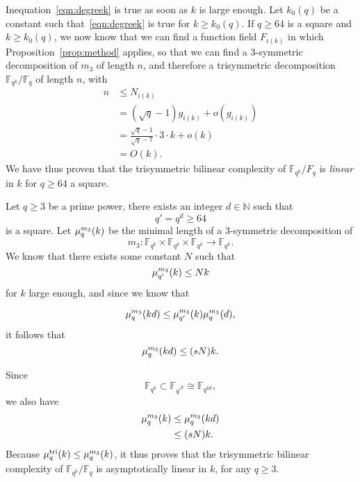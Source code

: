 \documentclass[11pt]{article}
\begin{document}
Inequation~\eqref{eqn:degreek} is true as soon as $k$ is large enough. Let
$k_0(q)$ be a constant such that~\eqref{eqn:degreek} is true for $k\geq k_0(q)$.
If $q\geq 64$ is a square and $k\geq k_0(q)$, we now know that we can find a
function field $F_{i(k)}$ in which Proposition~\ref{prop:method}
applies, so that we can find a $3$-symmetric decomposition of $m_3$ of length
$n$, and therefore a trisymmetric decomposition $\mathbb{F}_{q^k}/\mathbb{F}_q$ of length $n$, with
\begin{equation*}
  \begin{split}
    n&\leq N_{i(k)}\\
    &= (\sqrt q -1)g_{i(k)}+o(g_{i(k)})\\
    &= \frac{\sqrt q -1}{\sqrt q -7}\cdot3\cdot k+o(k)\\
    &= O(k).
  \end{split}
\end{equation*}
We have thus proven that the trisymmetric bilinear complexity of
$\mathbb{F}_{q^k}/F_{q}$ is \emph{linear} in $k$ for $q\geq64$ a square.

Let $q\geq3$ be a prime power, there exists an integer $d\in\mathbb{N}$ such that
\[
  q' = q^d \geq 64
\]
is a square. Let $\mu_{q}^{m_3}(k)$ be the minimal length of a $3$-symmetric
decomposition of
\[
  m_3:\mathbb{F}_{q^{k}}\times\mathbb{F}_{q^k}\times\mathbb{F}_{q^k}\to\mathbb{F}_{q^k}.
\]
We know that there exists some constant
$N$ such that
\[
  \mu_{q'}^{m_3}(k)\leq Nk
\]
for $k$ large enough, and since we know that

\[
  \mu_{q}^{m_3}(kd)\leq\mu_{q'}^{m_3}(k)\mu_{q}^{m_3}(d),
\]
it follows that
\[
  \mu_{q}^{m_3}(kd) \leq (sN)k.
\]
\begin{center}
\end{center}
Since
\[
  \mathbb{F}_{q^k}\subset\mathbb{F}_{q'^k}\cong\mathbb{F}_{q^{kd}},
\]
we also have
\begin{equation*}
  \begin{split}
    \mu_{q}^{m_3}(k)&\leq\mu_{q}^{m_3}(kd)\\
    &\leq (sN)k.
  \end{split}
\end{equation*}
Because $\mu_{q}^{\text{tri}}(k)\leq\mu_{q}^{m_3}(k)$, it thus proves that the trisymmetric bilinear complexity of
$\mathbb{F}_{q^k}/\mathbb{F}_q$ is asymptotically linear in $k$, for any $q\geq3$.



\end{document}
